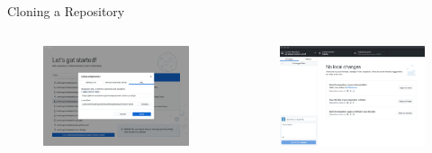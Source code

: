 \documentclass{beamer}
\begin{document}
    \begin{frame}{Cloning a Repository}
        \begin{columns}
            \begin{figure}
                \centering
                \includegraphics[width=\textwidth]{figures/clone_4.png}
            \end{figure}

            \begin{figure}
                \centering
                \includegraphics[width=\textwidth]{figures/clone_5.png}
            \end{figure}
        \end{columns}
    \end{frame}
\end{document}
